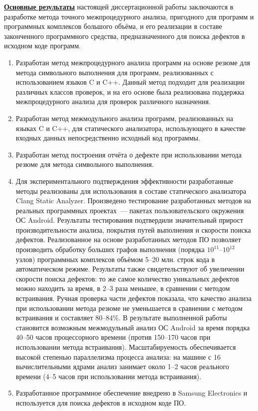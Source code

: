 \underline{\textbf{Основные результаты}} настоящей диссертационной работы заключаются в разработке метода точного межпроцедурного анализа, пригодного для программ и программных комплексов большого объёма, и его реализации в составе законченного программного средства, предназначенного для поиска дефектов в исходном коде программ.
\begin{enumerate}[leftmargin=1em]
  \item Разработан метод межпроцедурного анализа программ на основе резюме для метода символьного выполнения для программ, реализованных с использованием языков C и C++. Данный метод подходит для реализации различных классов проверок, и на его основе была реализована поддержка межпроцедурного анализа для проверок различного назначения.
  \item Разработан метод межмодульного анализа программ, реализованных на языках C и C++, для статического анализатора, использующего в качестве входных данных непосредственно исходный код программы.
  \item Разработан метод построения отчёта о дефекте при использовании метода резюме для метода символьного выполнения.
  \item Для экспериментального подтверждения эффективности разработанные методы реализованы для использования в составе статического анализатора Clang Static Analyzer. Произведено тестирование разработанных методов на реальных программных проектах~--- пакетах пользовательского окружения ОС Android. Результаты тестирования подтвердили значительный прирост производительности анализа, покрытия путей выполнения и скорости поиска дефектов. Реализованное на основе разработанных методов ПО позволяет производить обработку больших графов выполнения (порядка $10^{11}$--$10^{12}$ узлов) программных комплексов объёмом 5--20 млн. строк кода в автоматическом режиме. Результаты также свидетельствуют об увеличении скорости поиска дефектов: то же самое количество уникальных дефектов можно находить за время, в 2--3 раза меньшее, в сравнении с методом встраивания. Ручная проверка части дефектов показала, что качество анализа при использовании метода резюме не уменьшается в сравнении с методом встраивания и составляет 80--84\%. В результате выполненной работы становится возможным межмодульный анализ ОС Android за время порядка 40--50 часов процессорного времени (против 150--170 часов при использовании метода встраивания). Масштабируемость обеспечивается высокой степенью параллелизма процесса анализа: на машине с 16 вычислительными ядрами анализ занимает около 1--2 часов реального времени (4--5 часов при использовании метода встраивания).
  \item Разработанное программное обеспечение внедрено в Samsung Electronics и используется для поиска дефектов в исходном коде ПО.
\end{enumerate}


\renewcommand{\refname}{\large Публикации автора по теме диссертации}
\insertbiblioauthor                          %
